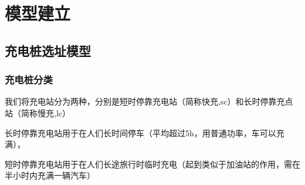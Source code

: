 \documentclass[12pt, a4paper, oneside]{ctexart}
\begin{document}
\section{模型建立}
\subsection{充电桩选址模型}
\subsubsection{充电桩分类}
我们将充电站分为两种，分别是短时停靠充电站（简称快充,sc）和长时停靠充点站（简称慢充,lc）

长时停靠充电站用于在人们长时间停车（平均超过5h，用普通功率，车可以充满），

短时停靠充电站用于在人们长途旅行时临时充电（起到类似于加油站的作用，需在半小时内充满一辆汽车）
\end{document}
